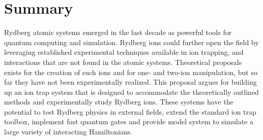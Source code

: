 
\section{Summary}

Rydberg atomic systems emerged in the last decade as powerful tools for quantum computing and simulation. Rydberg ions could further open the field by leveraging established experimental techniques available in ion trapping, and interactions that are not found in the atomic systems. Theoretical proposals exists for the creation of such ions and for one- and two-ion manipulation, but so far they have not been experimentally realized. This proposal argues for building up an ion trap system that is designed to accommodate the theoretically outlined methods and experimentally study Rydberg ions. These systems have the potential to test Rydberg physics in external fields, extend the standard ion trap toolbox, implement fast quantum gates and provide model system to simulate a large variety of interacting Hamiltonians.
